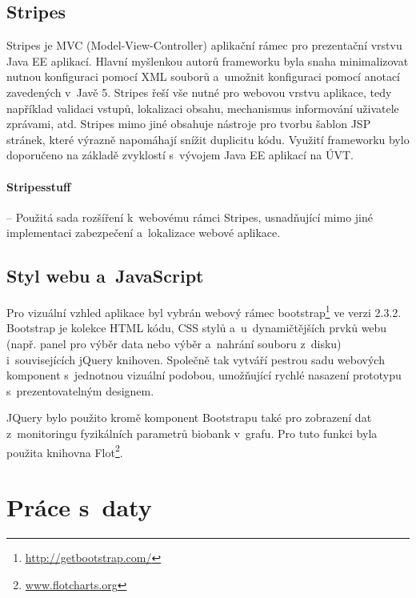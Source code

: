 \documentclass[11pt, final, oneside]{fithesis2}
\begin{document}
\subsection{Stripes}
Stripes je MVC (Model-View-Controller) aplikační rámec pro prezentační vrstvu Java EE aplikací. Hlavní myšlenkou autorů frameworku byla snaha minimalizovat nutnou konfiguraci pomocí XML souborů a~umožnit konfiguraci pomocí anotací zavedených v~Javě 5. Stripes řeší vše nutné pro webovou vrstvu aplikace, tedy například validaci vstupů, lokalizaci obsahu, mechanismus informování uživatele zprávami, atd. Stripes mimo jiné obsahuje nástroje pro tvorbu šablon JSP stránek, které výrazně napomáhají snížit duplicitu kódu.
Využití frameworku bylo doporučeno na základě zvyklostí s~vývojem Java EE aplikací na ÚVT.

\paragraph*{Stripesstuff} -- Použitá sada rozšíření k~webovému rámci Stripes, usnadňující mimo jiné implementaci zabezpečení a~lokalizace webové aplikace. 

\subsection{Styl webu a~JavaScript}
Pro vizuální vzhled aplikace byl vybrán webový rámec bootstrap\footnote{\url{http://getbootstrap.com/}} ve verzi 2.3.2. Bootstrap je kolekce HTML kódu, CSS stylů a~u~dynamičtějších prvků webu (např. panel pro výběr data nebo výběr a~nahrání souboru z~disku) i~souvisejících jQuery knihoven. Společně tak vytváří pestrou sadu webových komponent s~jednotnou vizuální podobou, umožňující rychlé nasazení prototypu s~prezentovatelným designem. 

JQuery bylo použito kromě komponent Bootstrapu také pro zobrazení dat z~monitoringu fyzikálních parametrů biobank v~grafu. Pro tuto funkci byla použita knihovna Flot\footnote{\url{www.flotcharts.org}}. 


\section{Práce s~daty}
\end{document}
